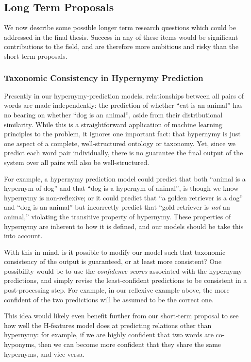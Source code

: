 \documentclass[12pt]{article}
\begin{document}
\subsection{Long Term Proposals}

We now describe some possible longer term research questions which could be
addressed in the final thesis. Success in any of these items would
be significant contributions to the field, and are therefore more ambitious and
risky than the short-term proposals.

\subsubsection{Taxonomic Consistency in Hypernymy Prediction}

Presently in our hypernymy-prediction models, relationships between all
pairs of words are made independently: the prediction of whether ``cat is an
animal'' has no bearing on whether ``dog is an animal'', aside from their
distributional similarity. While this is a straightforward application of
machine learning principles to the problem, it ignores one important fact: that
hypernymy is just one aspect of a complete, well-structured ontology or
taxonomy. Yet, since we predict each word pair individually, there is no
guarantee the final output of the system over all pairs will also be
well-structured.

For example, a hypernymy prediction model could predict that both ``animal is a
hypernym of dog'' and that ``dog is a hypernym of animal'', is though we know
hypernymy is non-reflexive; or it could predict that ``a golden retriever is a
dog'' and ``dog is an animal'' but incorrectly predict that ``gold retriever is
{\em not} an animal,'' violating the transitive property of hypernymy. These
properties of hypernymy are inherent to how it is defined, and our models
should be take this into account.

With this in mind, is it possible to modify our model such that taxonomic
consistency of the output is guaranteed, or at least more consistent? One
possibility would be to use the {\em confidence scores} associated with the
hypernymy predictions, and simply revise the least-confident predictions to
be consistent in a post-processing step. For example, in our reflexive example
above, the more confident of the two predictions will be assumed to be
the correct one.

This idea would likely even benefit further from our short-term proposal to
see how well the H-features model does at predicting relations other
than hypernymy: for example, if we are highly confident that two words are
co-hyponyms, then we can become more confident that they share the same
hypernyms, and vice versa.
\end{document}
